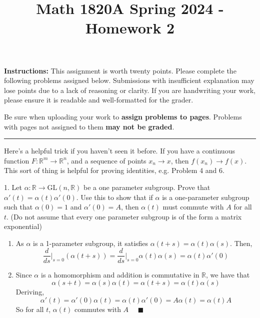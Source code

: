 \documentclass[12pt]{article}
\title{Math 1820A Spring 2024 - Homework 2}
\date{}
\newcommand{\R}{\mathbb{R}}
\newcommand{\GL}{\text{GL}}
\newcommand{\lra}{\longrightarrow}
\renewcommand{\R}{\mathbb{R}}
\newcommand{\qed}{\quad \blacksquare}
\begin{document}
\maketitle
\vspace{-0.5in}
\begin{spacing}{1.5}
\noindent \textbf{Instructions:}  This assignment is worth twenty points.  Please complete the following problems assigned below.  Submissions with insufficient explanation may lose points due to a lack of reasoning or clarity.  If you are handwriting your work, please ensure it is readable and well-formatted for the grader.

Be sure when uploading your work to \textbf{assign problems to pages}.  Problems with pages not assigned to them \textbf{may not be graded}.  
\end{spacing}

\hrule

\vspace{10mm}\noindent

\noindent
Here's a helpful trick if you haven't seen it before.  If you have a continuous function $F: \R^{m} \lra \R^{n}$, and a sequence of points $x_{n} \lra x$, then $f(x_{n}) \lra f(x)$.  This sort of thing is helpful for proving identities, e.g. Problem 4 and 6. 
\vspace*{0.25in}

1.  Let $\alpha: \R \lra \GL(n,\R)$ be a one parameter subgroup.  Prove that $\alpha'(t) = \alpha(t)\alpha'(0)$.  Use this to show that if $\alpha$ is a one-parameter subgroup such that $\alpha(0) = 1$ and $\alpha'(0) = A$, then $\alpha(t)$ must commute with $A$ for all $t$.  (Do not assume that every one parameter subgroup is of the form a matrix exponential)

    \color{blue}
        \begin{enumerate}
            \item As $\alpha$ is a 1-parameter subgroup, it satisfies $\alpha(t+s) = \alpha(t)\alpha(s)$. Then,
            \[\frac{d}{ds}\bigg\vert_{s=0}(\alpha(t+s)) = \frac{d}{ds}\bigg\vert_{s=0}\alpha(t)\alpha(s) = \alpha(t)\alpha'(0)\] 

            \item Since $\alpha$ is a homomorphism and addition is commutative in $\R$, we have that 
            \[\alpha(s + t) = \alpha(s)\alpha(t) = \alpha(t + s) = \alpha(t)\alpha(s)\]
            Deriving, 
            \[\alpha'(t) = \alpha'(0)\alpha(t) = \alpha(t)\alpha'(0) = A\alpha(t) = \alpha(t)A\]
            So for all $t$, $\alpha(t)$ commutes with $A$ $\qed$
        \end{enumerate}
    \color{black}
\end{document}
